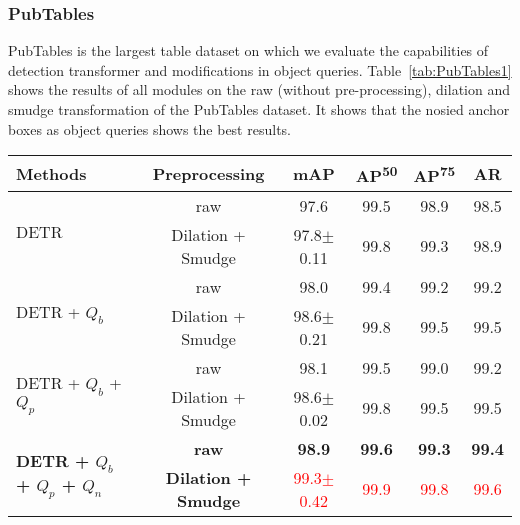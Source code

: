 \documentclass[sn-mathphys]{sn-jnl}\jyear{2021}\theoremstyle{thmstyleone}\newtheorem{theorem}{Theorem}\newtheorem{proposition}[theorem]{Proposition}\theoremstyle{thmstyletwo}\newtheorem{example}{Example}\newtheorem{remark}{Remark}\theoremstyle{thmstylethree}\newtheorem{definition}{Definition}\usepackage{amsmath}
\begin{document}
\subsubsection{PubTables}
\label{sec:PubTables-result}
PubTables is the largest table dataset on which we evaluate the capabilities of detection transformer and modifications in object queries. Table~\ref{tab:PubTables1} shows the results of all modules on the raw (without pre-processing), dilation and smudge transformation of the PubTables dataset. It shows that the nosied anchor boxes as object queries shows the best results.

\begin{table*}[h!]
\tiny
\begin{center}
\caption{Comparison between transformer-based detector results on  raw (without pre-processing), dilation and smudge transformation of the PubTables dataset. Here, term $Q_b$ represents object queries as anchor boxes, $Q_p$ denotes object queries with positive noise and $Q_n$ indicates object queries with negative noise. The IoU thresholds are set to 0.5 and 0.75 for average precision and also calculate average recall for large objects. The best results are highlighted. }\label{tab:PubTables1}
\begin{tabular*}{\textwidth}{@{\extracolsep{\fill}}lccccc@{\extracolsep{\fill}}}
\toprule
\textbf{Methods} & 
\textbf{Preprocessing } &
\textbf{mAP} & 
\textbf{AP\textsuperscript{50}} &
\textbf{AP\textsuperscript{75}} &
\textbf{AR} \\
\midrule
\multirow{2}{*}{DETR} & raw & 97.6& 99.5 & 98.9  & 98.5\\
& Dilation + Smudge & 97.8$\pm$0.11 & 99.8 & 99.3 & 98.9\\

\midrule
 \multirow{2}{*}{DETR + $Q_b$ }& raw & 98.0 & 99.4 & 99.2 & 99.2\\
& Dilation + Smudge & 98.6$\pm$0.21 & 99.8& 99.5 & 99.5\\
\midrule

\multirow{2}{*}{DETR + $Q_b$ + $Q_p$} & raw & 98.1 & 99.5 & 99.0 & 99.2\\
& Dilation + Smudge & 98.6$\pm$0.02 & 99.8 & 99.5 & 99.5\\
\midrule
\multirow{2}{*}{\textbf{DETR + $Q_b$ + $Q_p$ + $Q_n$}}& \textbf{raw} & \textbf{98.9} & \textbf{99.6} & \textbf{99.3} & \textbf{99.4}\\
& \textbf{Dilation + Smudge} & \textcolor{red}{99.3$\pm$0.42} & \textcolor{red}{99.9} & \textcolor{red}{99.8} & \textcolor{red}{99.6}\\
\bottomrule
\end{tabular*}
\end{center}
\end{table*} 
\end{document}
